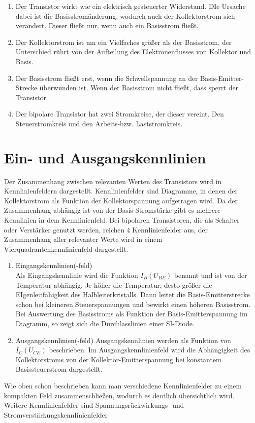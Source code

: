 \begin{enumerate} 
\item Der Transistor wirkt wie ein elektrisch gesteuerter Widerstand. DIe Ursache dabei ist die
Basisstromänderung, wodurch auch der Kollektorstrom sich verändert. Dieser fließt nur,
wenn auch ein Basisstrom fließt.
\item Der Kollektorstrom ist um ein Vielfaches größer als der Basisstrom, der Unterschied
rührt von der Aufteilung des Elektronenflusses von Kollektor und Basis.
\item Der Basisstrom fließt erst, wenn die Schwellspannung an der Basis-Emitter-Strecke
überwunden ist. Wenn der Basisstrom nicht fließt, dass sperrt der Transistor
\item Der bipolare Transistor hat zwei Stromkreise, der dieser vereint. Den Steuerstromkreis
und den Arbeits-bzw. Laststromkreis.
\end{enumerate}

\section{Ein- und Ausgangskennlinien}
Der Zusammenhang zwischen relevanten Werten des Transistors wird in Kennlinienfeldern dargestellt. 
Kennlinienfelder sind Diagramme, in denen der Kollektorstrom als Funktion der Kollektorspannung aufgetragen wird. Da der Zusammenhang abhängig ist von der Basis-Stromstärke
gibt es mehrere Kennlinien in dem Kennlinienfeld. Bei bipolaren Transistoren, die als Schalter oder Verst\"arker genutzt werden, reichen 4 Kennlinienfelder aus, der Zusammenhang aller relevanter Werte wird in einem Vierquadrantenkennlinienfeld dargestellt. \\
\begin{enumerate} 
\item Eingangskennlinien(-feld)\\
Als Eingangskennlinie wird die Funktion $I_B(U_{BE})$ benannt und ist von der Temperatur abh\"angig. Je h\"oher die Temperatur, desto  gr\"o\ss{}er die EIgenleitf\"ahigkeit des Halbleiterkristalls. Dann leitet die Basis-Emitterstrecke schon bei kleineren Steuerspannungen und bewirkt einen h\"oheren Basisstrom. \\
Bei Auswertung des Basisstroms als Funktion der Basis-Emitterspannung im Diagramm, so zeigt sich die Durchlasslinien einer SI-Diode. 

\item Ausgangskennlinien(-feld)
Ausgangskennlinien werden als Funktion von $I_C(U_{CE})$ beschrieben. Im Ausgangskennlinienfeld wird die Abh\"angigkeit des Kollektorstroms von der Kollektor-Emitterspannung bei konstantem Basissteuerstrom dargestellt. 
\end{enumerate}
Wie oben schon beschrieben kann man verschiedene Kennlinienfelder zu einem kompakten Feld zusammenschlie\ss{}en, wodurch es deutlich \"ubersichtlich wird. Weitere Kennlinienfelder sind Spannungsr\"uckwirkungs- und Stromverst\"arkungskennlinienfelder

